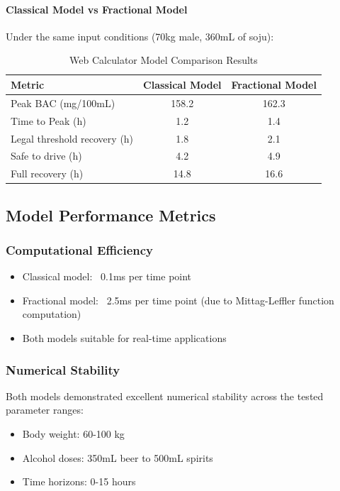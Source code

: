 \documentclass[11pt]{article}
\begin{document}
\paragraph{Classical Model vs Fractional Model}
Under the same input conditions (70kg male, 360mL of soju):

\begin{table}[H]
\centering
\caption{Web Calculator Model Comparison Results}
\begin{tabular}{|l|c|c|}
\hline
\textbf{Metric} & \textbf{Classical Model} & \textbf{Fractional Model} \\
\hline
Peak BAC (mg/100mL) & 158.2 & 162.3 \\
Time to Peak (h) & 1.2 & 1.4 \\
Legal threshold recovery (h) & 1.8 & 2.1 \\
Safe to drive (h) & 4.2 & 4.9 \\
Full recovery (h) & 14.8 & 16.6 \\

\hline
\end{tabular}
\end{table}

\subsection{Model Performance Metrics}

\subsubsection{Computational Efficiency}
\begin{itemize}
    \item Classical model: ~0.1ms per time point
    \item Fractional model: ~2.5ms per time point (due to Mittag-Leffler function computation)
    \item Both models suitable for real-time applications
\end{itemize}

\subsubsection{Numerical Stability}
Both models demonstrated excellent numerical stability across the tested parameter ranges:
\begin{itemize}
    \item Body weight: 60-100 kg
    \item Alcohol doses: 350mL beer to 500mL spirits
    \item Time horizons: 0-15 hours
\end{itemize}
\end{document}
